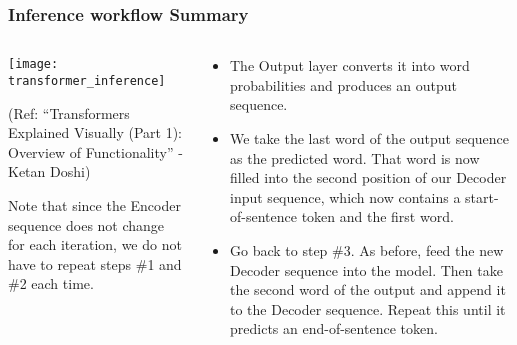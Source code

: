 \begin{frame}[fragile]\frametitle{Inference workflow Summary}

\begin{columns}
     \begin{column}[T]{0.5\linewidth}
\begin{center}
\texttt{[image: transformer\_inference]}


{\tiny (Ref: ``Transformers Explained Visually (Part 1): Overview of Functionality'' - Ketan Doshi)}
\end{center}		

Note that since the Encoder sequence does not change for each iteration, we do not have to repeat steps \#1 and \#2 each time.
		\end{column}
    \begin{column}[T]{0.5\linewidth}

\begin{itemize}
\item The Output layer converts it into word probabilities and produces an output sequence.
\item We take the last word of the output sequence as the predicted word. That word is now filled into the second position of our Decoder input sequence, which now contains a start-of-sentence token and the first word.
\item Go back to step \#3. As before, feed the new Decoder sequence into the model. Then take the second word of the output and append it to the Decoder sequence. Repeat this until it predicts an end-of-sentence token. 

\end{itemize}
    \end{column}
  \end{columns}	

\end{frame}




